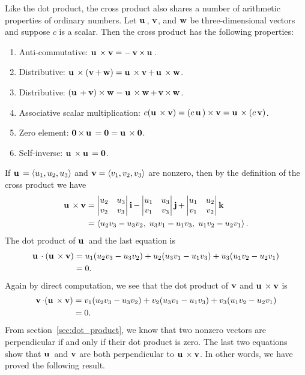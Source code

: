 Like the dot product, the cross product also shares a number of
arithmetic properties of ordinary numbers. Let $\vecu$, $\vecv$, and
$\vecw$ be three-dimensional vectors and suppose $c$ is a scalar. Then
the cross product has the following properties:
%
\begin{enumerate}
\item Anti-commutative:
  $\vecu \times \vecv = - \vecv \times \vecu$.

\item Distributive:
  $\vecu \times (\vecv + \vecw)
  =
  \vecu \times \vecv + \vecu \times \vecw$.

\item Distributive:
  $(\vecu + \vecv) \times \vecw
  =
  \vecu \times \vecw + \vecv \times \vecw$.

\item Associative scalar multiplication:
  $c (\vecu \times \vecv)
  =
  (c\vecu) \times \vecv
  = \vecu \times (c\vecv)$.

\item Zero element:
  $\veczero \times \vecu
  =
  \veczero
  =
  \vecu \times \veczero$.

\item Self-inverse: $\vecu \times \vecu = \veczero$.
\end{enumerate}

If $\vecu = \langle u_1, u_2, u_3 \rangle$ and
$\vecv = \langle v_1, v_2, v_3 \rangle$ are nonzero, then by the
definition of the cross product we have
%
\begin{align*}
\vecu \times \vecv
&=
\begin{vmatrix}
u_2 & u_3 \\
v_2 & v_3
\end{vmatrix}
\veci
-
\begin{vmatrix}
u_1 & u_3 \\
v_1 & v_3
\end{vmatrix}
\vecj
+
\begin{vmatrix}
u_1 & u_2 \\
v_1 & v_2
\end{vmatrix}
\veck \\
&=
\left\langle
u_2 v_3 - u_3 v_2,\; u_3 v_1 - u_1 v_3,\; u_1 v_2 - u_2 v_1
\right\rangle.
\end{align*}
%
The dot product of $\vecu$ and the last equation is
%
\begin{align*}
\vecu \cdot (\vecu \times \vecv)
&=
u_1 ( u_2 v_3 - u_3 v_2 ) +
u_2 ( u_3 v_1 - u_1 v_3 ) +
u_3 ( u_1 v_2 - u_2 v_1 ) \\
&=
0.
\end{align*}
%
Again by direct computation, we see that the dot product of $\vecv$
and $\vecu \times \vecv$ is
%
\begin{align*}
\vecv \cdot (\vecu \times \vecv)
&=
v_1 ( u_2 v_3 - u_3 v_2 ) +
v_2 ( u_3 v_1 - u_1 v_3 ) +
v_3 ( u_1 v_2 - u_2 v_1 ) \\
&=
0.
\end{align*}
%
From section~\ref{sec:dot_product}, we know that two nonzero vectors
are perpendicular if and only if their dot product is zero. The last
two equations show that $\vecu$ and $\vecv$ are both perpendicular to
$\vecu \times \vecv$. In other words, we have proved the following
result.

